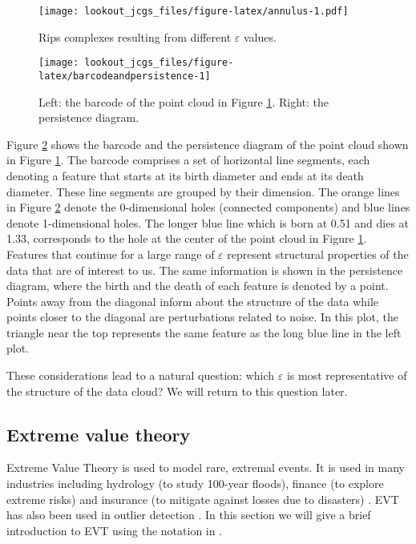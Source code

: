 \documentclass[12pt]{article}
\theoremstyle{definition}
\theoremstyle{definition}
\theoremstyle{definition}
\theoremstyle{definition}
\theoremstyle{remark}
\begin{document}
\begin{figure}
\centering
\texttt{[image: lookout\_jcgs\_files/figure-latex/annulus-1.pdf]}
\caption{\label{fig:annulus}Rips complexes resulting from different \(\varepsilon\) values.}
\end{figure}

\begin{figure}

{\centering \texttt{[image: lookout\_jcgs\_files/figure-latex/barcodeandpersistence-1]} 

}

\caption{Left: the barcode of the point cloud in Figure \ref{fig:annulus}. Right: the persistence diagram.}\label{fig:barcodeandpersistence}
\end{figure}

Figure \ref{fig:barcodeandpersistence} shows the barcode and the persistence diagram of the point cloud shown in Figure \ref{fig:annulus}. The barcode comprises a set of horizontal line segments, each denoting a feature that starts at its birth diameter and ends at its death diameter. These line segments are grouped by their dimension. The orange lines in Figure \ref{fig:barcodeandpersistence} denote the 0-dimensional holes (connected components) and blue lines denote 1-dimensional holes. The longer blue line which is born at 0.51 and dies at 1.33, corresponds to the hole at the center of the point cloud in Figure \ref{fig:annulus}. Features that continue for a large range of \(\varepsilon\) represent structural properties of the data that are of interest to us. The same information is shown in the persistence diagram, where the birth and the death of each feature is denoted by a point. Points away from the diagonal inform about the structure of the data while points closer to the diagonal are perturbations related to noise. In this plot, the triangle near the top represents the same feature as the long blue line in the left plot.

These considerations lead to a natural question: which \(\varepsilon\) is most representative of the structure of the data cloud? We will return to this question later.

\hypertarget{subsec:evt}{%
\subsection{Extreme value theory}\label{subsec:evt}}

Extreme Value Theory is used to model rare, extremal events. It is used in many industries including hydrology (to study 100-year floods), finance (to explore extreme risks) and insurance (to mitigate against losses due to disasters) \citep{Reiss2001}. EVT has also been used in outlier detection \citep{wilkinson2017visualizing, talagala2019anomaly}. In this section we will give a brief introduction to EVT using the notation in \citet{coles2001introduction}.
\end{document}
